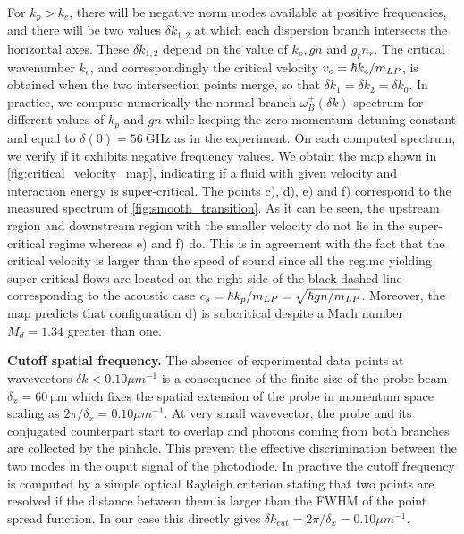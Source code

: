 For $k_p>k_c$, there will be negative norm modes available at positive frequencies, and there will be two values $\delta k_{1,2}$ at which each dispersion branch intersects the horizontal axes. These $\delta k_{1,2}$ depend on the value of $k_p, gn$ and $g_rn_r$. 
The critical wavenumber $k_c$, and correspondingly the critical velocity $v_c=\hbar k_c/m_{LP}$, is obtained when the two intersection points merge, so that $\delta k_1=\delta k_2=\delta k_0$.
In practice, we compute numerically the  normal branch $\omega_B^+(\delta k)$ spectrum for different values of $k_p$ and $gn$ while keeping the zero momentum detuning constant 
and equal to $\delta(0)=\SI{56}{\giga\hertz}$ as in the experiment. On each computed spectrum, we verify if it exhibits negative frequency values. We obtain the map shown in \autoref{fig:critical_velocity_map}, indicating  if a fluid with given velocity and interaction energy is super-critical. The points c), d), e) and f) correspond to the measured spectrum of \autoref{fig:smooth_transition}.
As it can be seen, the upstream region and downstream region with the smaller velocity do not lie in the super-critical regime whereas e) and f) do. This is in agreement with the fact that the critical velocity is larger than the speed of sound since 
all the regime yielding super-critical flows are located on the right side of the black dashed line corresponding to the acoustic case $c_s = \hbar k_p/m_{LP}=\sqrt{\hbar gn/m_{LP}}$. Moreover, the map predicts that configuration d) is subcritical despite a 
Mach number $M_d=1.34$ greater than one.

\bigskip

\textbf{Cutoff spatial frequency.} The absence of experimental data points at wavevectors $\delta k < 0.10 \mu m^{-1}$ is a consequence of the finite size 
of the probe beam $\delta_x = \SI{60}{\micro\meter}$ which fixes the spatial extension of the probe in momentum space
 scaling as $2\pi/\delta_x=0.10 \mu m^{-1}$. At very small wavevector, the probe and its conjugated counterpart start to overlap and photons
 coming from both branches are collected by the pinhole. This prevent the effective discrimination between the two modes in the ouput signal of the photodiode. In practive the 
 cutoff frequency is computed by a simple optical Rayleigh criterion stating that two points are resolved if the distance between them is larger than the FWHM of the point spread function.
In our case this directly gives $\delta k_{cut} = 2\pi/\delta_x= 0.10 \mu m^{-1}$.

